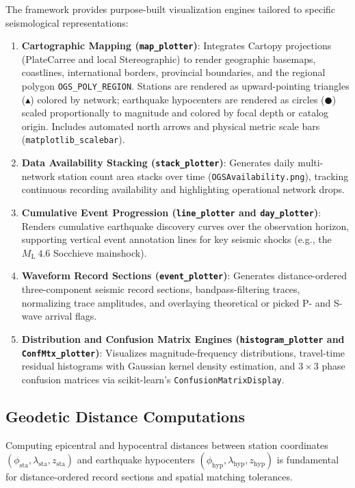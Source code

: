 The framework provides purpose-built visualization engines tailored to specific seismological representations:
\begin{enumerate}
  \item \textbf{Cartographic Mapping (\texttt{map\_plotter})}: Integrates Cartopy projections (PlateCarree and local Stereographic) to render geographic basemaps, coastlines, international borders, provincial boundaries, and the regional polygon \texttt{OGS\_POLY\_REGION}. Stations are rendered as upward-pointing triangles ($\blacktriangle$) colored by network; earthquake hypocenters are rendered as circles ($\CIRCLE$) scaled proportionally to magnitude and colored by focal depth or catalog origin. Includes automated north arrows and physical metric scale bars (\texttt{matplotlib\_scalebar}).
  \item \textbf{Data Availability Stacking (\texttt{stack\_plotter})}: Generates daily multi-network station count area stacks over time (\texttt{OGSAvailability.png}), tracking continuous recording availability and highlighting operational network drops.
  \item \textbf{Cumulative Event Progression (\texttt{line\_plotter} and \texttt{day\_plotter})}: Renders cumulative earthquake discovery curves over the observation horizon, supporting vertical event annotation lines for key seismic shocks (e.g., the $M_{\mathrm{L}}~4.6$ Socchieve mainshock).
  \item \textbf{Waveform Record Sections (\texttt{event\_plotter})}: Generates distance-ordered three-component seismic record sections, bandpass-filtering traces, normalizing trace amplitudes, and overlaying theoretical or picked P- and S-wave arrival flags.
  \item \textbf{Distribution and Confusion Matrix Engines (\texttt{histogram\_plotter} and \texttt{ConfMtx\_plotter})}: Visualizes magnitude-frequency distributions, travel-time residual histograms with Gaussian kernel density estimation, and $3 \times 3$ phase confusion matrices via scikit-learn's \texttt{ConfusionMatrixDisplay}.
\end{enumerate}

\subsection{Geodetic Distance Computations}
\label{subsec:geodetic_math}

Computing epicentral and hypocentral distances between station coordinates $(\phi_{\mathrm{sta}}, \lambda_{\mathrm{sta}}, z_{\mathrm{sta}})$ and earthquake hypocenters $(\phi_{\mathrm{hyp}}, \lambda_{\mathrm{hyp}}, z_{\mathrm{hyp}})$ is fundamental for distance-ordered record sections and spatial matching tolerances.

